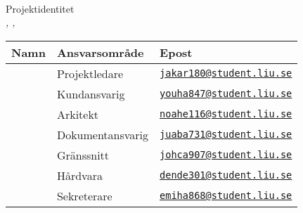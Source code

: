 \documentclass[systemskiss/skiss.tex]{subfiles}
\newenvironment{projektidentitet}{%
{\ }\vspace{30mm}
\renewcommand{\arraystretch}{2}
\begin{center}
  {\huge Projektidentitet\\[1ex]}
  \textsl{\VARgruppnummer, \LIPSdatum, \VARprojekttitel}\\[1cm]
    \begin{tabular}{lp{60mm}l}
      \hline
      \textbf{Namn} &
      \textbf{Ansvarsområde} &
      \textbf{Epost} \\
	\hline
      }%
      {%
      \hline
    \end{tabular}
\end{center}
}
\newcommand{\gruppmedlem}[3]{{#1} & {#2} & {#3} \\}
\begin{document}
\thispagestyle{empty}

\begin{projektidentitet}
\gruppmedlem{\VARprojektledare}{Projektledare}{\href{mailto:jakar180@student.liu.se}{\texttt{jakar180@student.liu.se}}}
\gruppmedlem{\VARkundansvarig}{Kundansvarig}{\href{mailto:youha847@student.liu.se}{\texttt{youha847@student.liu.se}}}
\gruppmedlem{\VARarkitekt}{Arkitekt}{\href{mailto:noahe116@student.liu.se}{\texttt{noahe116@student.liu.se}}}
\gruppmedlem{\VARdokumentansvarig}{Dokumentansvarig}{\href{mailto:juaba731@student.liu.se}{\texttt{juaba731@student.liu.se}}}

\gruppmedlem{\VARgranssnitt}{Gränssnitt}{\href{mailto:johca907@student.liu.se}{\texttt{johca907@student.liu.se}}}
\gruppmedlem{\VARhardware}{Hårdvara}{\href{mailto:dende301@student.liu.se}{\texttt{dende301@student.liu.se}}}
\gruppmedlem{\VARsekreterare}{Sekreterare}{\href{mailto:emiha868@student.liu.se}{\texttt{emiha868@student.liu.se}}}
\end{projektidentitet}

\newpage
\end{document}
